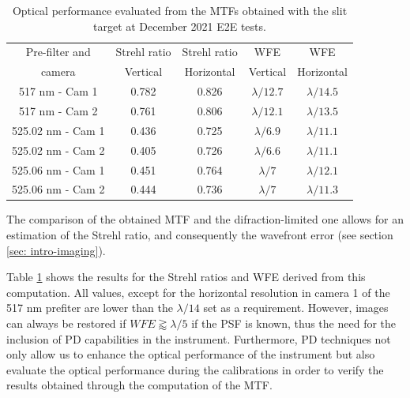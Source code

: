\begin{table}
    \centering
   \begin{tabular}{ccccc}
    \hline
    \hline
    Pre-filter and & Strehl ratio & Strehl ratio & WFE& WFE\\
    camera & Vertical & Horizontal & Vertical & Horizontal\\
    \hline
    517 nm - Cam 1 & 0.782 & 0.826 & $\lambda/12.7$ & $\lambda/14.5$ \\
    517 nm - Cam 2 & 0.761 & 0.806 & $\lambda/12.1$ & $\lambda/13.5$ \\
    525.02 nm - Cam 1 & 0.436 & 0.725 & $\lambda/6.9$ & $\lambda/11.1$ \\
    525.02 nm - Cam 2 & 0.405 & 0.726 & $\lambda/6.6$ & $\lambda/11.1$ \\
    525.06 nm - Cam 1 & 0.451 & 0.764 & $\lambda/7$ & $\lambda/12.1$ \\
    525.06 nm - Cam 2 & 0.444 & 0.736 & $\lambda/7$ & $\lambda/11.3$ \\
    \hline
    \hline
    \end{tabular}
    \caption{Optical performance evaluated from the MTFs obtained with the slit target at December 2021 E2E tests.}
    \label{table: Optical-performance}
\end{table}


The comparison of the obtained MTF and the difraction-limited one allows for an estimation of the Strehl ratio, and consequently the wavefront error (see section \ref{sec: intro-imaging}).

Table \ref{table: Optical-performance} shows the results for the Strehl ratios and WFE derived from this computation. All values, except for the horizontal resolution in camera 1 of the 517 nm prefiter are lower than the $\lambda/14$ set as a requirement. However, images can always be restored if $WFE \gtrapprox \lambda / 5$ \citep{restoration-limit} if the PSF is known, thus the need for the inclusion of PD capabilities in the instrument. Furthermore, PD techniques not only allow us to enhance the optical performance of the instrument but also evaluate the optical performance during the calibrations in order to verify the results obtained through the computation of the MTF. 

